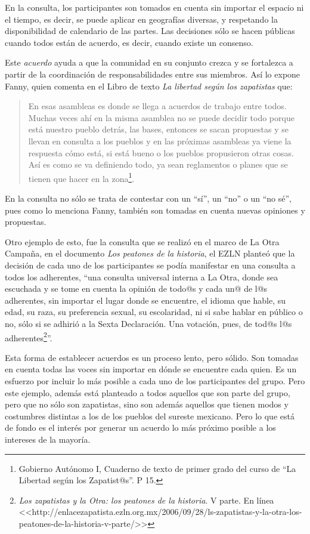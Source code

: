 \documentclass[oneside]{book}
\begin{document}
En la consulta, los participantes son tomados en cuenta sin importar el espacio ni el tiempo, es decir, se puede aplicar en geografías diversas, y respetando la disponibilidad de calendario de las partes. Las decisiones sólo se hacen públicas cuando todos están de acuerdo, es decir, cuando existe un consenso.

Este \textit{acuerdo} ayuda a que la comunidad en su conjunto crezca y se fortalezca a partir de la coordinación de responsabilidades entre sus miembros. Así lo expone Fanny, quien comenta en el Libro de texto \textit{La libertad según los zapatistas} que:

\begin{quote}
	En esas asambleas es donde se llega a acuerdos de trabajo entre todos. Muchas veces ahí en la misma asamblea no se puede decidir todo porque está nuestro pueblo detrás, las bases, entonces se sacan propuestas y se llevan en consulta a los pueblos y en las próximas asambleas ya viene la respuesta cómo está, si está bueno o los pueblos propusieron otras cosas. Así es como se va definiendo todo, ya sean reglamentos o planes que se tienen que hacer en la zona\footnote{ Gobierno Autónomo I, Cuaderno de texto de primer grado del curso de “La Libertad según los Zapatist@s”. P 15.}.
\end{quote}

En la consulta no sólo se trata de contestar con un “sí”, un “no” o un “no sé”, pues como lo menciona Fanny, también son tomadas en cuenta nuevas opiniones y propuestas. 
	
Otro ejemplo de esto, fue la consulta que se realizó en el marco de La Otra Campaña, en el documento \textit{Los peatones de la historia}, el EZLN planteó que la decisión de cada uno de los participantes se podía manifestar en una consulta a todos los adherentes, “una consulta universal interna a La Otra, donde sea escuchada y se tome en cuenta la opinión de todo@s y cada un@ de l@s adherentes, sin importar el lugar donde se encuentre, el idioma que hable, su edad, su raza, su preferencia sexual, su escolaridad, ni si sabe hablar en público o no, sólo si se adhirió a la Sexta Declaración.  Una votación, pues, de tod@s l@s adherentes\footnote{\textit{Los zapatistas y la Otra: los peatones de la historia}. V parte. En línea <<http://enlacezapatista.ezln.org.mx/2006/09/28/ls-zapatistas-y-la-otra-los-peatones-de-la-historia-v-parte/>>}”.

Esta forma de establecer acuerdos es un proceso lento, pero sólido. Son tomadas en cuenta todas las voces sin importar en dónde se encuentre cada quien. Es un esfuerzo por incluir lo más posible a cada uno de los participantes del grupo. Pero este ejemplo, además está planteado a todos aquellos que son parte del grupo, pero que no sólo son zapatistas, sino son además aquellos que tienen modos y costumbres distintas a los de los pueblos del sureste mexicano. Pero lo que está de fondo es el interés por generar un acuerdo lo más próximo posible a los intereses de la mayoría.
\end{document}

